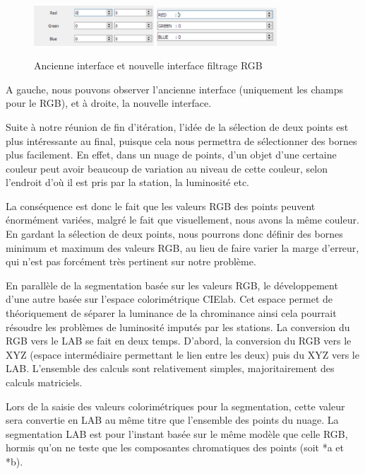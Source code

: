 \documentclass[12pt,titlepage,french]{article}
\begin{document}
\begin{figure}[!hbtp]
  \caption{\label{} Ancienne interface et nouvelle interface filtrage RGB}
  \includegraphics[width=0.4\textwidth]{./img/rgb_old.png}
\hspace*{1in}
\includegraphics[width=0.4\textwidth]{./img/rgb_new.png}
\end{figure}

A gauche, nous pouvons observer l'ancienne interface (uniquement les champs pour le RGB), et à droite, la nouvelle interface. \newline

Suite à notre réunion de fin d'itération, l'idée de la sélection de deux points est plus intéressante au final, puisque cela nous permettra de sélectionner des bornes plus facilement. En effet, dans un nuage de points, d'un objet d'une certaine couleur peut avoir beaucoup de variation au niveau de cette couleur, selon l'endroit d'où il est pris par la station, la luminosité etc. \newline

La conséquence est donc le fait que les valeurs RGB des points peuvent énormément variées, malgré le fait que visuellement, nous avons la même couleur. En gardant la sélection de deux points, nous pourrons donc définir des bornes minimum et maximum des valeurs RGB, au lieu de faire varier la marge d'erreur, qui n'est pas forcément très pertinent sur notre problème.

En parallèle de la segmentation basée sur les valeurs RGB, le développement d'une autre basée sur l'espace colorimétrique CIElab. Cet espace permet de théoriquement de séparer la luminance de la chrominance ainsi cela pourrait résoudre les problèmes de luminosité imputés par les stations.
La conversion du RGB vers le LAB se fait en deux temps. D'abord, la conversion du RGB vers le XYZ (espace intermédiaire permettant le lien entre les deux) puis du XYZ vers le LAB. L'ensemble des calculs sont relativement simples, majoritairement des calculs matriciels. 

Lors de la saisie des valeurs colorimétriques pour la segmentation, cette valeur sera convertie en LAB au même titre que l'ensemble des points du nuage.
La segmentation LAB est pour l'instant basée sur le même modèle que celle RGB, hormis qu'on ne teste que les composantes chromatiques des points (soit *a et *b). 
\end{document}
